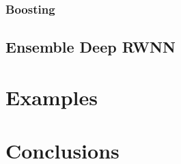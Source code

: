 \documentclass[
]{jss}
\begin{document}
\hypertarget{boosting}{%
\subsubsection{Boosting}\label{boosting}}

\hypertarget{ensemble-deep-rwnn}{%
\subsection{Ensemble Deep RWNN}\label{ensemble-deep-rwnn}}

\hypertarget{EX}{%
\section{Examples}\label{EX}}

\hypertarget{CON}{%
\section{Conclusions}\label{CON}}

\renewcommand\refname{References}

\end{document}
